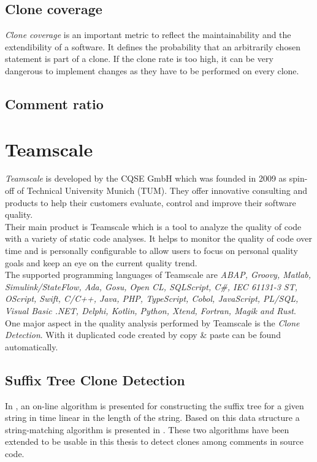 \subsection{Clone coverage}
\textit{Clone coverage }is an important metric to reflect the maintainability
and the extendibility of a software. It defines the probability that an arbitrarily chosen statement is part of a clone. If the clone rate is too high, it can be very dangerous to implement changes as they have to be performed on every clone.
\subsection{Comment ratio}

\section{Teamscale}
\label{section:teamscale}
\textit{Teamscale} is developed by the CQSE GmbH which was founded in 2009 as spin-off of Technical University Munich (TUM). They offer innovative consulting and products to help their customers evaluate, control and improve their software quality. \\
Their main product is Teamscale which is a tool to analyze the quality of code with a variety of static code analyses. It helps to monitor the quality of code over time and is personally configurable to allow users to focus on personal quality goals and keep an eye on the current quality trend.\\
The supported programming languages of Teamscale are \textit{ABAP, Groovy, Matlab, Simulink/StateFlow, Ada, Gosu, Open CL, SQLScript, C\#, IEC 61131-3 ST, OScript, Swift, C/C++, Java, PHP, TypeScript, Cobol, JavaScript, PL/SQL, Visual Basic .NET, Delphi, Kotlin, Python, Xtend, Fortran, Magik and Rust}.\\
One major aspect in the quality analysis performed by Teamscale is the \textit{Clone Detection}. With it duplicated code created by copy \& paste can be found automatically.
\subsection{Suffix Tree Clone Detection}
In \cite{Ukkonen1995}, an on-line algorithm is presented for constructing the suffix tree for a given string in time linear in the length of the string. Based on this data structure a string-matching algorithm is presented in \cite{Ukkonen1993}. These two algorithms have been extended to be usable in this thesis to detect clones among comments in source code.
